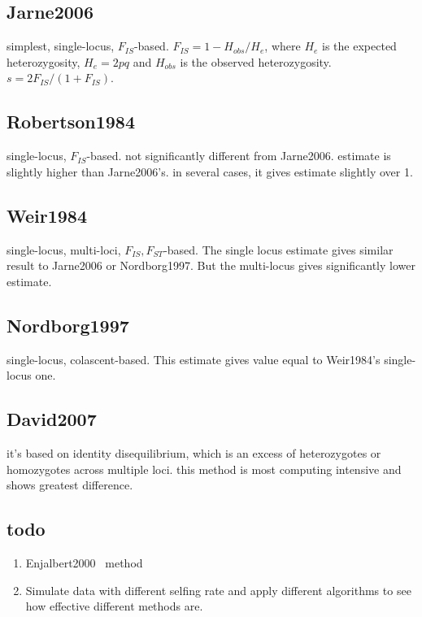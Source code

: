 \documentclass[a4paper,10pt]{article}
\begin{document}
\subsection{Jarne2006~\cite{Jarne2006}}
simplest, single-locus, $F_{IS}$-based. $F_{IS} = 1-H_{obs}/H_e$, where $H_e$ is the expected heterozygosity, $H_e = 2pq$ and $H_{obs}$ is the observed heterozygosity. $s = 2F_{IS}/(1+F_{IS})$.

\subsection{Robertson1984~\cite{Robertson1984}}
single-locus, $F_{IS}$-based. not significantly different from Jarne2006. estimate is slightly higher than Jarne2006's. in several cases, it gives estimate slightly over 1.

\subsection{Weir1984~\cite{Weir1984}}
single-locus, multi-loci, $F_{IS},F_{ST}$-based. The single locus estimate gives similar result to Jarne2006 or Nordborg1997. But the multi-locus gives significantly lower estimate.

\subsection{Nordborg1997~\cite{Nordborg1997}}
single-locus, colascent-based. This estimate gives value equal to Weir1984's single-locus one.

\subsection{David2007~\cite{David2007}}
it's based on identity disequilibrium, which is an excess of heterozygotes or homozygotes across multiple loci. this method is most computing intensive and shows greatest difference.

\subsection{todo}
\begin{enumerate}
 \item Enjalbert2000~\cite{Enjalbert2000} method
 \item Simulate data with different selfing rate and apply different algorithms to see how effective different methods are.
\end{enumerate}
\end{document}
